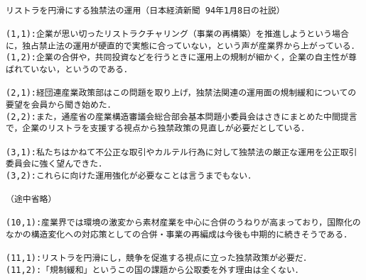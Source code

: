 \vspace*{2em}
{\baselineskip=15pt
\begin{verbatim}

リストラを円滑にする独禁法の運用（日本経済新聞 94年1月8日の社説）

(1,1):企業が思い切ったリストラクチャリング（事業の再構築）を推進しようという場合に，独占禁止法の運用が硬直的で実態に合っていない，という声が産業界から上がっている．
(1,2):企業の合併や，共同投資などを行うときに運用上の規制が細かく，企業の自主性が尊ばれていない，というのである．

(2,1):経団連産業政策部はこの問題を取り上げ，独禁法関連の運用面の規制緩和についての要望を会員から聞き始めた．
(2,2):また，通産省の産業構造審議会総合部会基本問題小委員会はさきにまとめた中間提言で，企業のリストラを支援する視点から独禁政策の見直しが必要だとしている．

(3,1):私たちはかねて不公正な取引やカルテル行為に対して独禁法の厳正な運用を公正取引委員会に強く望んできた．
(3,2):これらに向けた運用強化が必要なことは言うまでもない．

（途中省略）

(10,1):産業界では環境の激変から素材産業を中心に合併のうねりが高まっており，国際化のなかの構造変化への対応策としての合併・事業の再編成は今後も中期的に続きそうである．

(11,1):リストラを円滑にし，競争を促進する視点に立った独禁政策が必要だ．
(11,2):「規制緩和」というこの国の課題から公取委を外す理由は全くない．
\end{verbatim}
}

\vspace*{2em}

